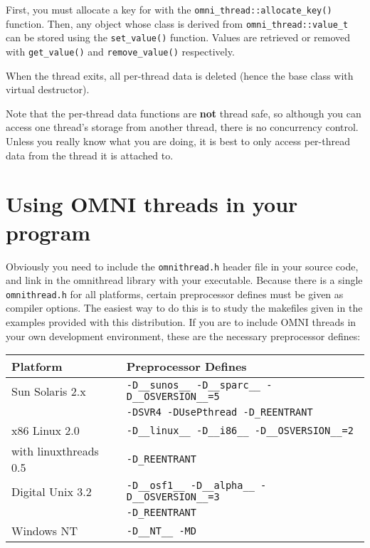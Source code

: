 \documentclass[11pt,twoside,a4paper]{article}
\begin{document}
First, you must allocate a key for with the
\texttt{omni\_thread::allocate\_key()} function. Then, any object
whose class is derived from \texttt{omni\_thread::value\_t} can be
stored using the \texttt{set\_value()} function. Values are retrieved
or removed with \texttt{get\_value()} and \texttt{remove\_value()}
respectively.

When the thread exits, all per-thread data is deleted (hence the base
class with virtual destructor).

Note that the per-thread data functions are \textbf{not} thread safe,
so although you can access one thread's storage from another thread,
there is no concurrency control. Unless you really know what you are
doing, it is best to only access per-thread data from the thread it is
attached to.




\section{Using OMNI threads in your program}

Obviously you need to include the \texttt{omnithread.h} header file in
your source code, and link in the omnithread library with your
executable.  Because there is a single \texttt{omnithread.h} for all
platforms, certain preprocessor defines must be given as compiler
options.  The easiest way to do this is to study the makefiles given
in the examples provided with this distribution.  If you are to
include OMNI threads in your own development environment, these are
the necessary preprocessor defines:

\vspace{.5\baselineskip}

\begin{tabular}{|l|l|} \hline
Platform & Preprocessor Defines \\ \hline \hline

Sun Solaris 2.x & \verb|-D__sunos__ -D__sparc__ -D__OSVERSION__=5| \\
 & \verb|-DSVR4 -DUsePthread -D_REENTRANT| \\ \hline

x86 Linux 2.0 & \verb|-D__linux__ -D__i86__ -D__OSVERSION__=2| \\
with linuxthreads 0.5 & \verb|-D_REENTRANT| \\ \hline

Digital Unix 3.2 & \verb|-D__osf1__ -D__alpha__ -D__OSVERSION__=3| \\
 & \verb|-D_REENTRANT| \\ \hline

Windows NT & \verb|-D__NT__ -MD| \\ \hline
\end{tabular}
\end{document}
